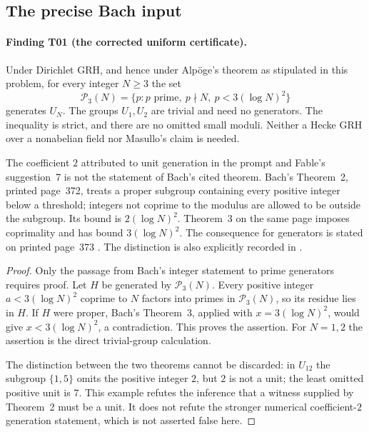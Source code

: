 \documentclass[11pt,a4paper]{article}
\begin{document}
\subsection{The precise Bach input}

\paragraph{Finding T01 (the corrected uniform certificate).}
Under Dirichlet GRH, and hence under Alp\"oge's theorem as stipulated
in this problem, for every integer $N\geq3$ the set
\[
 \mathcal P_3(N)=\{p:p\text{ prime},\ p\nmid N,
                              \ p<3(\log N)^2\}
 \tag{T01}
\]
generates $U_N$. The groups $U_1,U_2$ are trivial and need no generators.
The inequality is strict, and there are no omitted small moduli.
Neither a Hecke GRH over a nonabelian field nor Masullo's claim is needed.

The coefficient $2$ attributed to unit generation in the prompt and
Fable's suggestion~7 is not the statement of Bach's cited theorem.
Bach's Theorem~2, printed page~372, treats a proper subgroup containing
every positive integer below a threshold; integers not coprime to the
modulus are allowed to be outside the subgroup. Its bound is
$2(\log N)^2$. Theorem~3 on the same page imposes coprimality and has
bound $3(\log N)^2$. The consequence for generators is stated on
printed page~373 \cite[Theorems~2--3, pp.~372--373]{Bach1990}.
The distinction is also explicitly recorded in
\cite[\S1.1]{LLS2015}.

\begin{proof}
Only the passage from Bach's integer statement to prime generators
requires proof. Let $H$ be generated by $\mathcal P_3(N)$. Every positive
integer $a<3(\log N)^2$ coprime to $N$ factors into primes in
$\mathcal P_3(N)$, so its residue lies in $H$. If $H$ were proper,
Bach's Theorem~3, applied with $x=3(\log N)^2$, would give
$x<3(\log N)^2$, a contradiction. This proves the assertion. For
$N=1,2$ the assertion is the direct trivial-group calculation.

The distinction between the two theorems cannot be discarded: in
$U_{12}$ the subgroup $\{1,5\}$ omits the positive integer $2$, but
$2$ is not a unit; the least omitted positive unit is $7$. This example
refutes the inference that a witness supplied by Theorem~2 must be a
unit. It does not refute the stronger numerical coefficient-$2$
generation statement, which is not asserted false here.
\end{proof}
\end{document}
